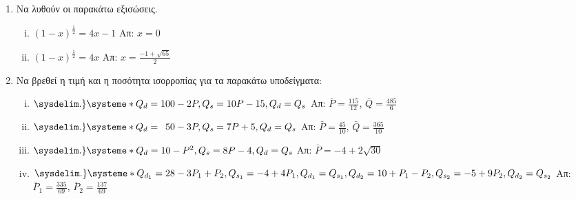 




\everymath{\displaystyle}




\begin{center}
\end{center}

\vspace{\baselineskip}


\begin{enumerate}

    \item Να λυθούν οι παρακάτω εξισώσεις.

        \begin{enumerate}[i)]
            \item $ (1-x)^{\frac{1}{2}} = 4x-1 $ \hfill Απ: $ x=0 $
            \item $ (1-x)^{\frac{1}{2}} = 4x $ \hfill Απ: $ x = \frac{-1+ \sqrt{65}}{2} $ 
        \end{enumerate}

    \item Να βρεθεί η τιμή και η ποσότητα ισορροπίας για τα παρακάτω υποδείγματα:

        \begin{enumerate}[i)]
            \item $\sysdelim.\}\systeme*{Q_{d} = 100 - 2P,Q_{s} = 10P-15,Q_{d}=Q_{s}} $
                \hfill Απ: $ \bar{P} = \frac{115}{12} $, $ \bar{Q} = \frac{485}{6} $

            \item  $\sysdelim.\}\systeme*{Q_{d} = \phantom{1}50 - 3P,Q_{s}=7P+5,Q_{d}=Q_{s}}$
                \hfill Απ: $ \bar{P} = \frac{45}{10} $, $ \bar{Q} = \frac{365}{10} $ 

            \item $\sysdelim.\}\systeme*{Q_{d}=10-P^{2},Q_{s}=8P-4,Q_{d}=Q_{s}} $
                \hfill Απ: $ \bar{P}=-4+2 \sqrt{30} $   

            \item $\sysdelim.\}\systeme*{Q_{d_{1}}=28-3P_{1}+P_{2},Q_{s_{1}}=-4+4P_{1},
                    Q_{d_{1}}=Q_{s_{1}},Q_{d_{2}}=10+P_{1}-P_{2},Q_{s_{2}}=-5+9P_{2},
                    Q_{d_{2}}=Q_{s_{2}}}$
                \hfill Απ: $ \bar{P}_{1} = \frac{335}{69} $, $ \bar{P}_{2} = \frac{137}{69} $  
        \end{enumerate}


\end{enumerate}
